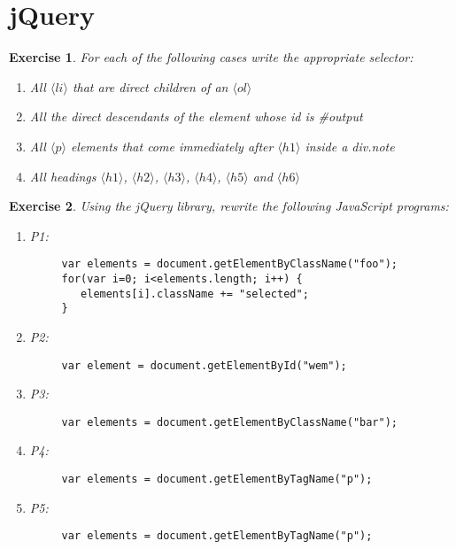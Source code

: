 \documentclass{article}
\newtheorem{ex}{Exercise}[section]
\begin{document}
\section{jQuery}


\newcommand{\tagh}[1]{\langle#1\rangle}
\begin{ex}
For each of the following cases write the appropriate selector: 
\begin{enumerate}
 \item All $\tagh{li}$ that are direct children of an $\tagh{ol}$
 \item All the direct descendants of the element whose id is \#output
 \item All $\tagh{p}$ elements that come immediately after $\tagh{h1}$ inside a div.note
 \item All headings $\tagh{h1}$, $\tagh{h2}$, $\tagh{h3}$, $\tagh{h4}$, $\tagh{h5}$ and $\tagh{h6}$  
\end{enumerate} 
\end{ex}

\begin{ex}
Using the jQuery library, rewrite the following JavaScript programs:
\begin{enumerate}
  \item P1: 
  \begin{verbatim}
     var elements = document.getElementByClassName("foo"); 
     for(var i=0; i<elements.length; i++) {
        elements[i].className += "selected";  
     } 
  \end{verbatim}
  \item P2: 
  \begin{verbatim}
     var element = document.getElementById("wem"); 
  \end{verbatim}
  \item P3: 
  \begin{verbatim}
     var elements = document.getElementByClassName("bar"); 
  \end{verbatim}  
  \item P4: 
  \begin{verbatim}
     var elements = document.getElementByTagName("p"); 
  \end{verbatim}  
  \item P5: 
  \begin{verbatim}
     var elements = document.getElementByTagName("p"); 
  \end{verbatim}
\end{enumerate}
\end{ex}
\end{document}
